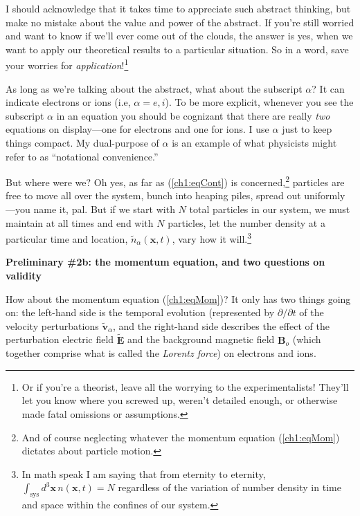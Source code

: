 I should acknowledge that it takes time to appreciate such abstract thinking,
but make no mistake about the value and power of the abstract. If you're still
worried and want to know if we'll ever come out of the clouds, the answer is
yes, when we want to apply our theoretical results to a particular situation. So
in a word, save your worries for \emph{application}!\footnote{Or if you're a
  theorist, leave all the worrying to the experimentalists! They'll let you know
  where you screwed up, weren't detailed enough, or otherwise made fatal
  omissions or assumptions.}

As long as we're talking about the abstract, what about the subscript $\alpha$?
It can indicate electrons or ions (i.e, $\alpha = e,i$). To be more explicit,
whenever you see the subscript $\alpha$ in an equation you should be cognizant
that there are really \emph{two} equations on display---one for electrons and
one for ions. I use $\alpha$ just to keep things compact. My dual-purpose of
$\alpha$ is an example of what physicists might refer to as ``notational
convenience.''

But where were we? Oh yes, as far as (\ref{ch1:eqCont}) is
concerned,\footnote{And of course neglecting whatever the momentum equation
  (\ref{ch1:eqMom}) dictates about particle motion.}  particles are free to move
all over the system, bunch into heaping piles, spread out uniformly---you name
it, pal. But if we start with $N$ total particles in our system, we must
maintain at all times and end with $N$ particles, let the number density at a
particular time and location, $\tilde n_{\alpha}(\mathbf{x},t)$, vary how it
will.\footnote{In math speak I am saying that from eternity to eternity,
  $\int_{\mathrm{sys}} d^3\mathbf{x} \, n(\mathbf{x},t) = N$ regardless of the
  variation of number density in time and space within the confines of our
  system.}

\textbf{Preliminary \#2b: the momentum equation, and two questions on validity}

How about the momentum equation (\ref{ch1:eqMom})? It only has two things going
on: the left-hand side is the temporal evolution (represented by $\partial
/ \partial t$ of the velocity perturbations $\mathbf{\tilde v}_\alpha$, and the
right-hand side describes the effect of the perturbation electric field
$\mathbf{\tilde E}$ and the background magnetic field $\mathbf{B}_o$ (which
together comprise what is called the \emph{Lorentz force}) on electrons and
ions.

